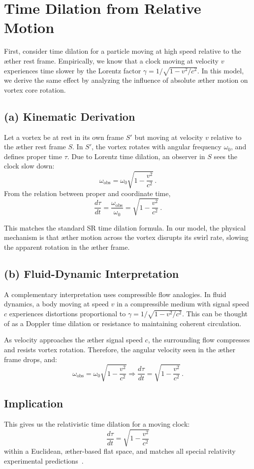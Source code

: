 
\section{Time Dilation from Relative Motion}

First, consider time dilation for a particle moving at high speed relative to the æther rest frame. Empirically, we know that a clock moving at velocity $v$ experiences time slower by the Lorentz factor $\gamma = 1/\sqrt{1 - v^2/c^2}$. In this model, we derive the same effect by analyzing the influence of absolute æther motion on vortex core rotation.

\subsection*{(a) Kinematic Derivation}

Let a vortex be at rest in its own frame $S'$ but moving at velocity $v$ relative to the æther rest frame $S$. In $S'$, the vortex rotates with angular frequency $\omega_0$, and defines proper time $\tau$. Due to Lorentz time dilation, an observer in $S$ sees the clock slow down:
\[
\omega_{\text{obs}} = \omega_0 \sqrt{1 - \frac{v^2}{c^2}} \,.
\]
From the relation between proper and coordinate time,
\[
\frac{d\tau}{dt} = \frac{\omega_{\text{obs}}}{\omega_0} = \sqrt{1 - \frac{v^2}{c^2}} \,. \tag{2}
\]

This matches the standard SR time dilation formula. In our model, the physical mechanism is that æther motion across the vortex disrupts its swirl rate, slowing the apparent rotation in the æther frame.

\subsection*{(b) Fluid-Dynamic Interpretation}

A complementary interpretation uses compressible flow analogies. In fluid dynamics, a body moving at speed $v$ in a compressible medium with signal speed $c$ experiences distortions proportional to $\gamma = 1/\sqrt{1 - v^2/c^2}$. This can be thought of as a Doppler time dilation or resistance to maintaining coherent circulation. 

As velocity approaches the æther signal speed $c$, the surrounding flow compresses and resists vortex rotation. Therefore, the angular velocity seen in the æther frame drops, and:
\[
\omega_{\text{obs}} = \omega_0 \sqrt{1 - \frac{v^2}{c^2}} \Rightarrow \frac{d\tau}{dt} = \sqrt{1 - \frac{v^2}{c^2}} \,. \tag{3}
\]

\subsection*{Implication}

This gives us the relativistic time dilation for a moving clock:
\[
\boxed{\frac{d\tau}{dt} = \sqrt{1 - \frac{v^2}{c^2}}}
\]
within a Euclidean, æther-based flat space, and matches all special relativity experimental predictions~\cite{Rado2020-aether-Lorentz,Levy2009-aether-clock}.
